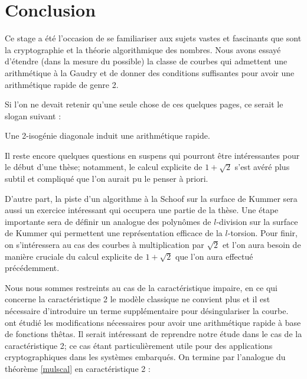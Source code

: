 \documentclass[a4paper,12pt]{article}
\newtheorem{theoreme}{Theorème}[section]
\theoremstyle{definition}
\theoremstyle{remark}
\numberwithin{equation}{section}
\begin{document}
\section{Conclusion}
Ce stage %
a été l'occasion de se familiariser aux sujets vastes et fascinants que sont la cryptographie et la théorie algorithmique des nombres. Nous avons essayé d'étendre (dans la mesure du possible) la classe de courbes qui admettent une arithmétique à la Gaudry et de donner des conditions suffisantes pour avoir une arithmétique rapide de genre 2.

Si l'on ne devait retenir qu'une seule chose de ces quelques pages, ce serait le slogan suivant :
\begin{center}
\huge{Une 2-isogénie diagonale induit une arithmétique rapide.}
\end{center}

Il reste encore quelques questions en suspens qui pourront être intéressantes pour le début d'une thèse; notamment, le calcul explicite de $1+\sqrt{2}$ s'est avéré plus subtil et compliqué que l'on aurait pu le penser à priori.

D'autre part, la piste d'un algorithme à la Schoof sur la surface de Kummer sera aussi un exercice intéressant qui occupera une partie de la thèse. Une étape importante sera de définir un analogue des polynômes de $l$-division sur la surface de Kummer qui permettent une représentation efficace de la $l$-torsion. Pour finir, on s'intéressera au cas des courbes à multiplication par $\sqrt{2}$ et l'on aura besoin de manière cruciale du calcul explicite de $1+\sqrt{2}$ que l'on aura effectué précédemment.

Nous nous sommes restreints au cas de la caractéristique impaire, en ce qui concerne la caractéristique 2 le modèle classique ne convient plus et il est nécessaire d'introduire un terme supplémentaire pour désingulariser la courbe. \citet{lubicz} ont étudié les modifications nécessaires pour avoir une arithmétique rapide à base de fonctions thêtas. Il serait intéressant de reprendre notre étude dans le cas de la caractéristique 2; ce cas étant particulièrement utile pour des applications cryptographiques dans les systèmes embarqués. On termine par l'analogue du théorème \ref{mulscal} en caractéristique 2 :

\end{document}
